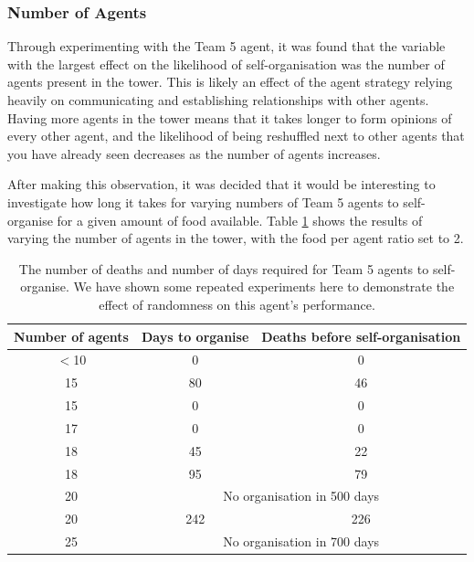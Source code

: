 \subsubsection*{Number of Agents}
Through experimenting with the Team 5 agent, it was found that the variable with the largest effect on the likelihood of self-organisation was the number of agents present in the tower. This is likely an effect of the agent strategy relying heavily on communicating and establishing relationships with other agents. Having more agents in the tower means that it takes longer to form opinions of every other agent, and the likelihood of being reshuffled next to other agents that you have already seen decreases as the number of agents increases.

After making this observation, it was decided that it would be interesting to investigate how long it takes for varying numbers of Team 5 agents to self-organise for a given amount of food available. Table \ref{tab:team5-exp-num-agents} shows the results of varying the number of agents in the tower, with the food per agent ratio set to 2.

\begin{table}
    \centering
    \begin{tabular}{|c|c|c|}
        \hline
        \textbf{Number of agents} & \textbf{Days to organise} & \textbf{Deaths before self-organisation}\\
        \hline
        $<$10 & 0 & 0 \\
        \hline
        15 & 80 & 46 \\
        \hline
        15 & 0 & 0 \\
        \hline
        17 & 0 & 0 \\
        \hline
        18 & 45 & 22\\
        \hline
        18 & 95 & 79 \\
        \hline
        20 & \multicolumn{2}{c|}{No organisation in 500 days}\\
        \hline
        20 & 242 & 226 \\
        \hline
        25 & \multicolumn{2}{c|}{No organisation in 700 days}\\
        \hline
        
    \end{tabular}
    \caption{The number of deaths and number of days required for Team 5 agents to self-organise. We have shown some repeated experiments here to demonstrate the effect of randomness on this agent's performance.}
    \label{tab:team5-exp-num-agents}
\end{table}

